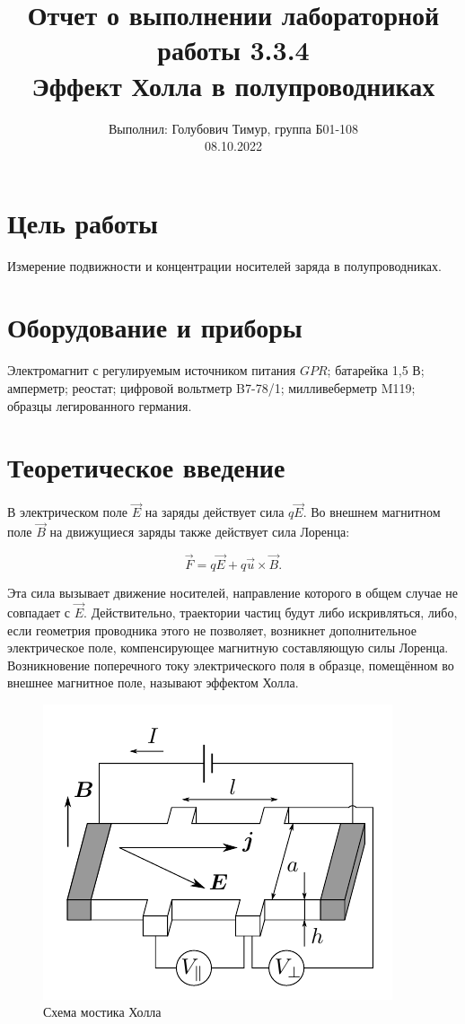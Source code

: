 \documentclass[12pt,a4paper]{article}
\author{\normalsize Выполнил: Голубович Тимур, группа Б01-108 \\
	\normalsize 08.10.2022}
\date{}
\title
{
	\large Отчет о выполнении лабораторной работы 3.3.4 \\
	\Large Эффект Холла в полупроводниках \\ 
}
\begin{document}
\maketitle
	
\section*{Цель работы}
Измерение подвижности и концентрации носителей заряда в полупроводниках.

\section*{Оборудование и приборы} 
Электромагнит с регулируемым источником питания $GPR$; \newline
батарейка 1,5 В; \newline
амперметр; \newline
реостат; \newline
цифровой вольтметр B7-78/1; \newline
милливеберметр M119; \newline
образцы легированного германия. \newline
	

\section*{Теоретическое введение}

В электрическом поле $\vec{E}$ на заряды действует сила $q\vec{E}$. Во внешнем магнитном поле $\vec{B}$ на движущиеся заряды также действует сила Лоренца:

$$ \vec{F} = q\vec{E} + q\vec{u} \times \vec{B}.$$

Эта сила вызывает движение носителей, направление которого в общем случае не совпадает с $\vec{E}$. Действительно, траектории частиц будут либо искривляться, либо, если геометрия проводника этого не позволяет, возникнет дополнительное электрическое поле, компенсирующее магнитную составляющую силы Лоренца. Возникновение поперечного току электрического поля в образце, помещённом во внешнее магнитное поле, называют эффектом Холла.


\begin{figure}[h]
	\includegraphics[width = 7 cm]{res/scheme_hall.png}
	\caption{Схема мостика Холла}
	\label{fig:scheme_hall}
\end{figure}
\end{document}
